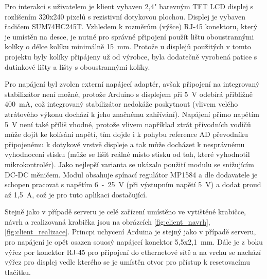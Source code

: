 Pro interakci s uživatelem je klient vybaven 2,4" barevným TFT LCD displej s rozlišením 320x240 pixelů s rezistivní dotykovou plochou. Displej je vybaven  řadičem SUM74HC245T. Vzhledem k rozměrům (výšce) RJ-45 konektoru, který je umístěn na desce, je nutné pro správné připojení použít lištu oboustrannými kolíky o délce kolíku minimálně 15~mm. Protože u displejů použitých v tomto projektu byly kolíky připájeny už od výrobce, byla dodatečně vyrobená patice s dutinkové lišty a lišty s oboustrannými kolíky.

Pro napájení byl zvolen externí napájecí adaptér, avšak připojení na integrovaný stabilizátor není možné, protože Arduino s displejem při 5~V odebírá přibližně 400~mA, což integrovaný stabilizátor nedokáže poskytnout (vlivem velého ztrátového výkonu dochází k jeho značnému zahřívání). Napájení přímo napětím 5~V není také příliš vhodné, protože vlivem například ztrát přívodních vodičů může dojít ke kolísání napětí, tím dojde i k pohybu reference AD převodníku připojenému k dotykové vrstvě displeje a tak může docházet k nesprávnému vyhodnocení stisku (může se lišit reálné místo stisku od toh, které vyhodnotil mikrokontrolér). Jako nejlepší varianta se ukázalo použití modulu se snižujícím DC-DC měničem. Modul obsahuje spínací regulátor MP1584 a dle dodavatele je schopen pracovat s napětím 6~-~25~V (při výstupním napětí 5~V) a dodat proud až 1,5~A, což je pro tuto aplikaci dostačující.

Stejně jako v případě serveru je celé zařízení umístěno ve vytištěné krabičce, návrh a realizovaná krabička jsou na obrázcích \ref{fig:client_navrh}, \ref{fig:client_realizace}. Princpi uchycení Arduina je stejný jako v případě serveru, pro napájení je opět osazen souosý napájecí konektor 5,5x2,1~mm. Dále je z boku výřez por konektor RJ-45 pro připojení do ethernetové sítě a na vrchu se nachází výřez pro displej vedle kterého se je umístěn otvor pro přístup k resetovacímu tlačítku.

